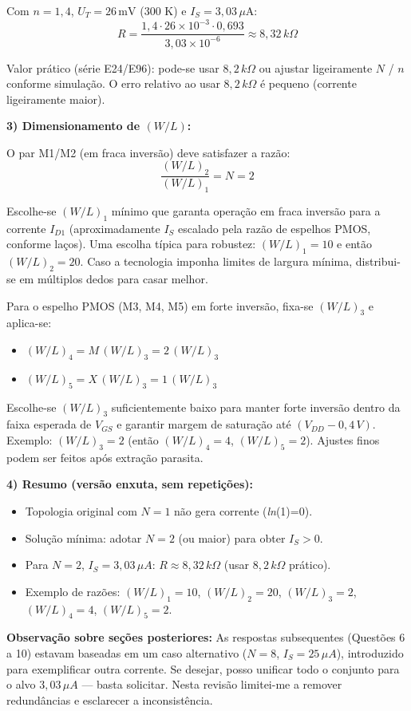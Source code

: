 \documentclass[12pt,a4paper]{article}
\begin{document}
Com $n = 1{,}4$, $U_T = 26\,\text{mV}$ (300 K) e $I_S = 3{,}03\,\mu\text{A}$:
$$ R = \frac{1{,}4 \cdot 26\times10^{-3} \cdot 0{,}693}{3{,}03\times10^{-6}} \approx 8{,}32\,k\Omega $$

Valor prático (série E24/E96): pode-se usar $8{,}2\,k\Omega$ ou ajustar ligeiramente $N$ / $n$ conforme simulação. O erro relativo ao usar $8{,}2\,k\Omega$ é pequeno (corrente ligeiramente maior).

	\textbf{3) Dimensionamento de $(W/L)$:}

O par M1/M2 (em fraca inversão) deve satisfazer a razão:
$$ \frac{(W/L)_2}{(W/L)_1} = N = 2 $$

Escolhe-se $(W/L)_1$ mínimo que garanta operação em fraca inversão para a corrente $I_{D1}$ (aproximadamente $I_S$ escalado pela razão de espelhos PMOS, conforme laços). Uma escolha típica para robustez: $(W/L)_1 = 10$ e então $(W/L)_2 = 20$. Caso a tecnologia imponha limites de largura mínima, distribui-se em múltiplos dedos para casar melhor.

Para o espelho PMOS (M3, M4, M5) em forte inversão, fixa-se $(W/L)_3$ e aplica-se:
\begin{itemize}
    \item $(W/L)_4 = M\,(W/L)_3 = 2\,(W/L)_3$
    \item $(W/L)_5 = X\,(W/L)_3 = 1\,(W/L)_3$
\end{itemize}

Escolhe-se $(W/L)_3$ suficientemente baixo para manter forte inversão dentro da faixa esperada de $V_{GS}$ e garantir margem de saturação até $(V_{DD} - 0{,}4\,V)$. Exemplo: $(W/L)_3 = 2$ (então $(W/L)_4 = 4$, $(W/L)_5 = 2$). Ajustes finos podem ser feitos após extração parasita.

	\textbf{4) Resumo (versão enxuta, sem repetições):}
\begin{itemize}
    \item Topologia original com $N=1$ não gera corrente (\textit{ln}(1)=0).
    \item Solução mínima: adotar $N=2$ (ou maior) para obter $I_S>0$.
    \item Para $N=2$, $I_S=3{,}03\,\mu A$: $R \approx 8{,}32\,k\Omega$ (usar $8{,}2\,k\Omega$ prático).
    \item Exemplo de razões: $(W/L)_1=10$, $(W/L)_2=20$, $(W/L)_3=2$, $(W/L)_4=4$, $(W/L)_5=2$.
\end{itemize}

	\textbf{Observação sobre seções posteriores:} As respostas subsequentes (Questões 6 a 10) estavam baseadas em um caso alternativo ($N=8$, $I_S=25\,\mu A$), introduzido para exemplificar outra corrente. Se desejar, posso unificar todo o conjunto para o alvo $3{,}03\,\mu A$ — basta solicitar. Nesta revisão limitei-me a remover redundâncias e esclarecer a inconsistência.
\end{document}
